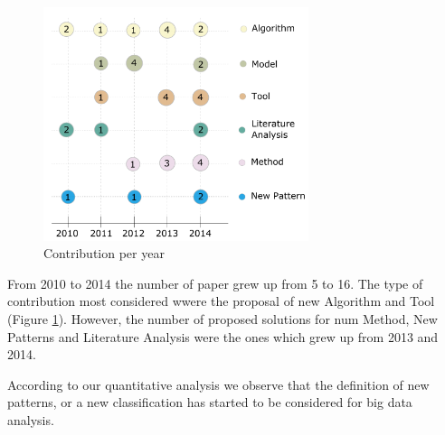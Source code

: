\begin{figure}[hbtp]
\centering
\includegraphics[width=0.69\textwidth]{figs/ContributionPerYear.pdf}
\caption{Contribution per year}
\label{fig:contribution-per-year}
\end{figure}


From 2010 to 2014 the number of paper grew up from 5 to 16. The type of
contribution most considered wwere the proposal of new Algorithm and Tool
(Figure \ref{fig:contribution-per-year}). However, the number of proposed
solutions for num Method, New Patterns and Literature Analysis were the ones
which grew up from 2013 and 2014. 


According to our quantitative analysis we observe that the definition of new
patterns, or a new classification has started to be considered for big data
analysis. 


